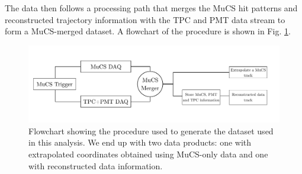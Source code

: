 \documentclass[a4paper]{scrartcl}
\begin{document}
The data then follows a processing path that merges the MuCS hit patterns and reconstructed trajectory information with the TPC and PMT data stream to form a MuCS-merged dataset. A flowchart of the procedure is shown in Fig. \ref{fig:scheme}.

\begin{figure}[htbp]
  \includegraphics[width=\linewidth]{figures/scheme.pdf}
  \caption{Flowchart showing the procedure used to generate the dataset used in this analysis. We end up with two data products: one with extrapolated coordinates obtained using MuCS-only data and one with reconstructed data information.} \label{fig:scheme}
\end{figure}
\end{document}
